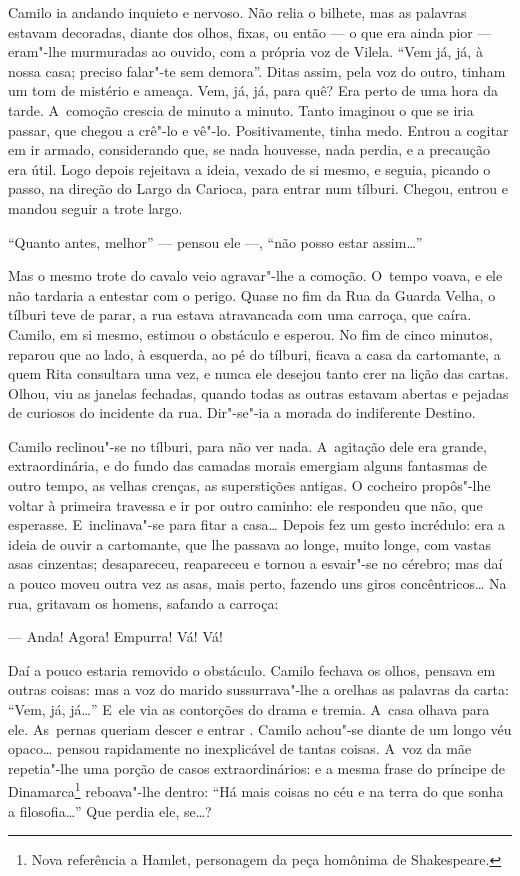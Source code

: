 \begin{linenumbers}
Camilo ia andando inquieto e nervoso. Não relia o bilhete, mas as
palavras estavam decoradas, diante dos olhos, fixas, ou então --- o que
era ainda pior --- eram"-lhe murmuradas ao ouvido, com a própria voz de
Vilela. ``Vem já, já, à nossa casa; preciso falar"-te sem demora''. Ditas
assim, pela voz do outro, tinham um tom de mistério e ameaça. Vem, já,
já, para quê? Era perto de uma hora da tarde. A~comoção crescia de
minuto a minuto. Tanto imaginou o que se iria passar, que chegou a
crê"-lo e vê"-lo. Positivamente, tinha medo. Entrou a cogitar em ir
armado, considerando que, se nada houvesse, nada perdia, e a precaução
era útil. Logo depois rejeitava a ideia, vexado de si mesmo, e seguia,
picando o passo, na direção do Largo da Carioca, para entrar num
tílburi. Chegou, entrou e mandou seguir a trote largo.

``Quanto antes, melhor'' --- pensou ele ---, ``não posso estar assim\ldots{}''

Mas o mesmo trote do cavalo veio agravar"-lhe a comoção. O~tempo voava, e
ele não tardaria a entestar com o perigo. Quase no fim da Rua da Guarda
Velha, o tílburi teve de parar, a rua estava atravancada com uma
carroça, que caíra. Camilo, em si mesmo, estimou o obstáculo e esperou.
No fim de cinco minutos, reparou que ao lado, à esquerda, ao pé do
tílburi, ficava a casa da cartomante, a quem Rita consultara uma vez, e
nunca ele desejou tanto crer na lição das cartas. Olhou, viu as janelas
fechadas, quando todas as outras estavam abertas e pejadas de curiosos
do incidente da rua. Dir"-se"-ia a morada do indiferente Destino.

Camilo reclinou"-se no tílburi, para não ver nada. A~agitação dele era
grande, extraordinária, e do fundo das camadas morais emergiam alguns
fantasmas de outro tempo, as velhas crenças, as superstições antigas. O
cocheiro propôs"-lhe voltar à primeira travessa e ir por outro caminho:
ele respondeu que não, que esperasse. E~inclinava"-se para fitar a
casa\ldots{} Depois fez um gesto incrédulo: era a ideia de ouvir a
cartomante, que lhe passava ao longe, muito longe, com vastas asas
cinzentas; desapareceu, reapareceu e tornou a esvair"-se no cérebro; mas
daí a pouco moveu outra vez as asas, mais perto, fazendo uns giros
concêntricos\ldots{} Na rua, gritavam os homens, safando a carroça:

--- Anda! Agora! Empurra! Vá! Vá!

Daí a pouco estaria removido o obstáculo. Camilo fechava os olhos,
pensava em outras coisas: mas a voz do marido sussurrava"-lhe a orelhas
as palavras da carta: ``Vem, já, já\ldots{}'' E~ele via as contorções do
drama e tremia. A~casa olhava para ele. As~pernas queriam descer e
entrar . Camilo achou"-se diante de um longo véu opaco\ldots{} pensou
rapidamente no inexplicável de tantas coisas. A~voz da mãe repetia"-lhe
uma porção de casos extraordinários: e a mesma frase do príncipe de
Dinamarca\footnote{Nova referência a Hamlet, personagem da peça homônima
  de Shakespeare.} reboava"-lhe dentro: ``Há mais coisas no céu e na
terra do que sonha a filosofia\ldots{}'' Que perdia ele, se\ldots{}?


\end{linenumbers}
